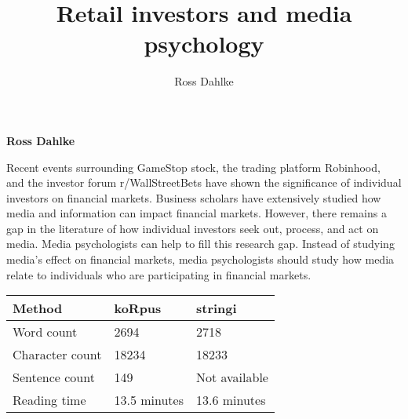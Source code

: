 \documentclass[12pt,]{article}
\title{Retail investors and media psychology  }
\author{\Large Ross Dahlke\vspace{0.05in} \newline\normalsize\emph{}  }
\date{}
\newcommand*{\authorfont}{\fontfamily{phv}\selectfont}
\renewenvironment{abstract}
 {{%
    \setlength{\leftmargin}{0mm}
    \setlength{\rightmargin}{\leftmargin}%
  }%
  \relax}
 {\endlist}
\begin{document}
	
%

{%
\setlength{\parindent}{0pt}
\thispagestyle{plain}
{\fontsize{18}{20}\selectfont\raggedright 
\maketitle  %

}

{
   \vskip 13.5pt\relax \normalsize\fontsize{11}{12} 
\textbf{\authorfont Ross Dahlke} \hskip 15pt \emph{\small }   

}

}








\begin{abstract}

    \hbox{\vrule height .2pt width 39.14pc}

    \vskip 8.5pt %

\noindent Recent events surrounding GameStop stock, the trading platform
Robinhood, and the investor forum r/WallStreetBets have shown the
significance of individual investors on financial markets. Business
scholars have extensively studied how media and information can impact
financial markets. However, there remains a gap in the literature of how
individual investors seek out, process, and act on media. Media
psychologists can help to fill this research gap. Instead of studying
media's effect on financial markets, media psychologists should study
how media relate to individuals who are participating in financial
markets.


    \hbox{\vrule height .2pt width 39.14pc}


\end{abstract}


\vskip -8.5pt



\noindent \doublespacing 

\begin{longtable}[]{@{}lll@{}}
\toprule
Method & koRpus & stringi\tabularnewline
\midrule
\endhead
Word count & 2694 & 2718\tabularnewline
Character count & 18234 & 18233\tabularnewline
Sentence count & 149 & Not available\tabularnewline
Reading time & 13.5 minutes & 13.6 minutes\tabularnewline
\bottomrule
\end{longtable}
\end{document}
